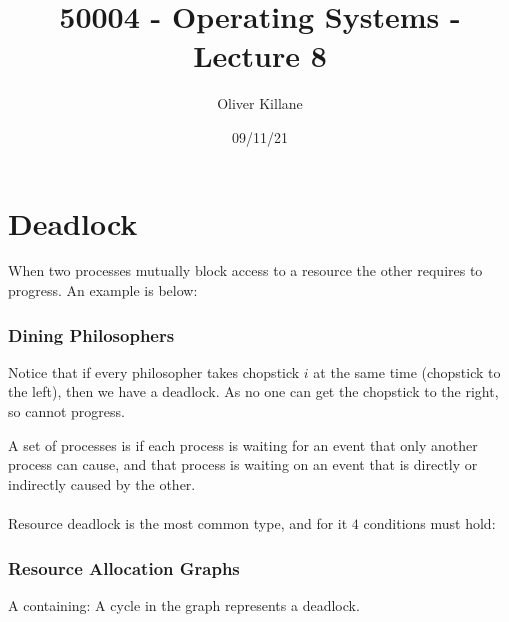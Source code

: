 \documentclass{report}
\title{50004 - Operating Systems - Lecture 8}
\author{Oliver Killane}
\date{09/11/21}
\begin{document}
\maketitle
{}

\section*{Deadlock}
When two processes mutually block access to a resource the other requires to progress. An example is below:
\subsubsection*{Dining Philosophers}
Notice that if every philosopher takes chopstick $i$ at the same time (chopstick to the left), then we have a deadlock. As no one can get the chopstick to the right, so cannot progress.

A set of processes is  if each process is waiting for an event that only another process can cause, and that process is waiting on an event that is directly or indirectly caused by the other.
\\
\\Resource deadlock is the most common type, and for it $4$ conditions must hold:
\begin{itemize}
\end{itemize}
\subsubsection*{Resource Allocation Graphs}
A  containing:
A cycle in the graph represents a deadlock.
\end{document}
